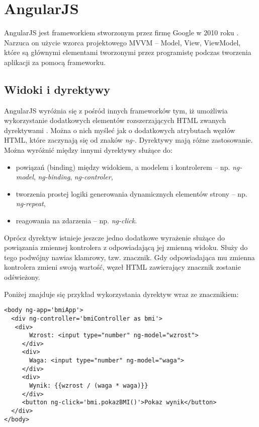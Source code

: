 \section{AngularJS}

AngularJS jest frameworkiem stworzonym przez firmę Google w 2010 roku \cite{angular-book}. Narzuca on użycie wzorca projektowego MVVM -- Model, View, ViewModel, które są głównymi elementami tworzonymi przez programistę podczas tworzenia aplikacji za pomocą frameworku. 

\subsection{Widoki i dyrektywy}
AngularJS wyróżnia się z pośród innych frameworków tym, iż umożliwia wykorzystanie dodatkowych elementów rozszerzających HTML zwanych dyrektywami \cite{angular-book}. Można o nich myśleć jak o dodatkowych atrybutach węzłów HTML, które zaczynają się od znaków \textit{ng-}. Dyrektywy mają różne zastosowanie. Można wyróżnić między innymi dyrektywy służące do:
\begin{itemize}
\item powiązań (binding) między widokiem, a modelem i kontrolerem -- np. \textit{ng-model}, \textit{ng-binding}, \textit{ng-controler},
\item tworzenia prostej logiki generowania dynamicznych elementów strony -- np. \textit{ng-repeat},
\item reagowania na zdarzenia -- np. \textit{ng-click}.
\end{itemize}

Oprócz dyrektyw istnieje jeszcze jedno dodatkowe wyrażenie służące do powiązania zmiennej kontrolera z odpowiadającą jej zmienną widoku. Służy do tego podwójny nawias klamrowy, tzw. znacznik. Gdy odpowiadająca mu zmienna kontrolera zmieni swoją wartość, węzeł HTML zawierający znacznik zostanie odświeżony.

Poniżej znajduje się przykład wykorzystania dyrektyw wraz ze znacznikiem:

\begin{lstlisting}[language=HTML5]
<body ng-app='bmiApp'>
  <div ng-controller='bmiController as bmi'>
   <div>
       Wzrost: <input type="number" ng-model="wzrost">
     </div>
     <div>
       Waga: <input type="number" ng-model="waga">
     </div>
     <div>
       Wynik: {{wzrost / (waga * waga)}}
     </div>
     <button ng-click='bmi.pokazBMI()'>Pokaz wynik</button>
  </div>
</body>
\end{lstlisting}

